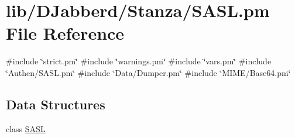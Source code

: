 \hypertarget{_s_a_s_l_8pm}{
\section{lib/\-D\-Jabberd/\-Stanza/\-S\-A\-S\-L.pm \-File \-Reference}
\label{_s_a_s_l_8pm}
}
{\ttfamily \#include \char`\"{}strict.\-pm\char`\"{}}\*
{\ttfamily \#include \char`\"{}warnings.\-pm\char`\"{}}\*
{\ttfamily \#include \char`\"{}vars.\-pm\char`\"{}}\*
{\ttfamily \#include \char`\"{}\-Authen/\-S\-A\-S\-L.\-pm\char`\"{}}\*
{\ttfamily \#include \char`\"{}\-Data/\-Dumper.\-pm\char`\"{}}\*
{\ttfamily \#include \char`\"{}\-M\-I\-M\-E/\-Base64.\-pm\char`\"{}}\*
\subsection*{\-Data \-Structures}
\begin{DoxyCompactItemize}
\item 
class \hyperlink{class_d_jabberd_1_1_stanza_1_1_s_a_s_l}{\-S\-A\-S\-L}
\end{DoxyCompactItemize}
